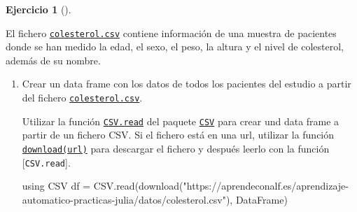 \documentclass[
  a4paper,
]{scrreport}
\newenvironment{Shaded}{\begin{snugshade}}{\end{snugshade}}
\newcommand{\BuiltInTok}[1]{\textcolor[rgb]{0.00,0.23,0.31}{#1}}
\newcommand{\FunctionTok}[1]{\textcolor[rgb]{0.28,0.35,0.67}{#1}}
\newcommand{\ImportTok}[1]{\textcolor[rgb]{0.00,0.46,0.62}{#1}}
\newcommand{\NormalTok}[1]{\textcolor[rgb]{0.00,0.23,0.31}{#1}}
\newcommand{\OperatorTok}[1]{\textcolor[rgb]{0.37,0.37,0.37}{#1}}
\newcommand{\StringTok}[1]{\textcolor[rgb]{0.13,0.47,0.30}{#1}}
\theoremstyle{definition}
\newtheorem{exercise}{Ejercicio}[chapter]
\theoremstyle{remark}
\begin{document}
\begin{exercise}[]\protect\hypertarget{exr-preprocesamiento-2}{}\label{exr-preprocesamiento-2}

El fichero \href{datos/colesterol.csv}{\texttt{colesterol.csv}} contiene
información de una muestra de pacientes donde se han medido la edad, el
sexo, el peso, la altura y el nivel de colesterol, además de su nombre.

\begin{enumerate}
\def\labelenumi{\alph{enumi}.}
\item
  Crear un data frame con los datos de todos los pacientes del estudio a
  partir del fichero
  \href{datos/colesterol.csv}{\texttt{colesterol.csv}}.

  \begin{tcolorbox}[enhanced jigsaw, left=2mm, colback=white, coltitle=black, opacitybacktitle=0.6, titlerule=0mm, breakable, bottomrule=.15mm, toptitle=1mm, bottomtitle=1mm, colbacktitle=quarto-callout-note-color!10!white, opacityback=0, rightrule=.15mm, title=\textcolor{quarto-callout-note-color}{\faInfo}\hspace{0.5em}{Ayuda}, colframe=quarto-callout-note-color-frame, arc=.35mm, leftrule=.75mm, toprule=.15mm]

  Utilizar la función
  \href{https://csv.juliadata.org/stable/reading.html\#CSV.read}{\texttt{CSV.read}}
  del paquete \href{https://csv.juliadata.org/}{\texttt{CSV}} para crear
  und data frame a partir de un fichero CSV. Si el fichero está en una
  url, utilizar la función
  \href{https://docs.julialang.org/en/v1/base/download/\#Base.download}{\texttt{download(url)}}
  para descargar el fichero y después leerlo con la función
  {[}\texttt{CSV.read}{]}.

  \end{tcolorbox}

  \begin{tcolorbox}[enhanced jigsaw, left=2mm, colback=white, coltitle=black, opacitybacktitle=0.6, titlerule=0mm, breakable, bottomrule=.15mm, toptitle=1mm, bottomtitle=1mm, colbacktitle=quarto-callout-tip-color!10!white, opacityback=0, rightrule=.15mm, title=\textcolor{quarto-callout-tip-color}{\faLightbulb}\hspace{0.5em}{Solución}, colframe=quarto-callout-tip-color-frame, arc=.35mm, leftrule=.75mm, toprule=.15mm]

\begin{Shaded}
\begin{Highlighting}[]
\ImportTok{using} \BuiltInTok{CSV}
\NormalTok{df }\OperatorTok{=}\NormalTok{ CSV.}\FunctionTok{read}\NormalTok{(}\FunctionTok{download}\NormalTok{(}\StringTok{"https://aprendeconalf.es/aprendizaje{-}automatico{-}practicas{-}julia/datos/colesterol.csv"}\NormalTok{), DataFrame)}
\end{Highlighting}
\end{Shaded}


\end{tcolorbox}
\end{enumerate}
\end{exercise}
\end{document}
